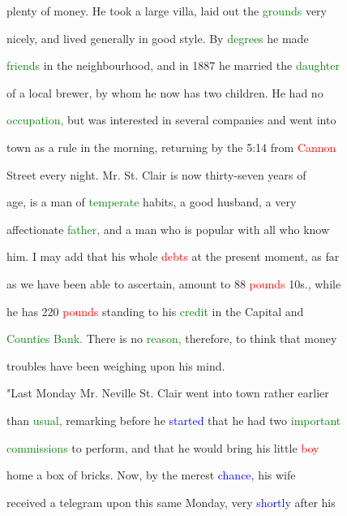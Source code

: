  plenty of \textcolor{BurntOrange}{money.} He took a large villa, laid out the \textcolor{green}{grounds} very

 nicely, and lived generally in \textcolor{BurntOrange}{good} style. By \textcolor{green}{degrees} he made

 \textcolor{green}{friends} in the neighbourhood, and in 1887 he married the \textcolor{green}{daughter}

 of a local brewer, by whom he now has two \textcolor{BurntOrange}{children.} He had no

 \textcolor{green}{occupation,} but was \textcolor{BurntOrange}{interested} in several companies and went into

 town as a \textcolor{BurntOrange}{rule} in the morning, returning by the 5:14 from \textcolor{red}{Cannon}

 Street every night. Mr. St. Clair is now thirty-seven years of

 age, is a man of \textcolor{green}{temperate} habits, a \textcolor{BurntOrange}{good} husband, a very

 affectionate \textcolor{green}{father,} and a man who is popular with all who know

 him. I may add that his whole \textcolor{red}{debts} at the \textcolor{BurntOrange}{present} moment, as far

 as we have been able to ascertain, amount to 88 \textcolor{red}{pounds} 10s., while

 he has 220 \textcolor{red}{pounds} standing to his \textcolor{green}{credit} in the Capital and

 \textcolor{green}{Counties} \textcolor{green}{Bank.} There is no \textcolor{green}{reason,} therefore, to think that \textcolor{BurntOrange}{money}

 troubles have been \textcolor{BurntOrange}{weighing} upon his mind.



 "Last Monday Mr. Neville St. Clair went into town rather earlier

 than \textcolor{green}{usual,} remarking before he \textcolor{blue}{started} that he had two \textcolor{green}{important}

 \textcolor{green}{commissions} to perform, and that he would bring his little \textcolor{red}{boy}

 home a box of bricks. Now, by the merest \textcolor{blue}{chance,} his wife

 received a telegram upon this same Monday, very \textcolor{blue}{shortly} after his

